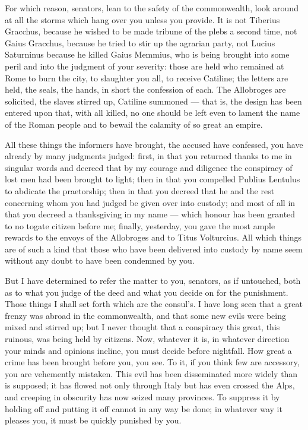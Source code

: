  For which reason, senators, lean to the safety of the commonwealth, look around at all the storms which hang over you unless you provide. It is not Tiberius Gracchus, because he wished to be made tribune of the plebs a second time, not Gaius Gracchus, because he tried to stir up the agrarian party, not Lucius Saturninus because he killed Gaius Memmius, who is being brought into some peril and into the judgment of your severity: those are held who remained at Rome to burn the city, to slaughter you all, to receive Catiline; the letters are held, the seals, the hands, in short the confession of each. The Allobroges are solicited, the slaves stirred up, Catiline summoned --- that is, the design has been entered upon that, with all killed, no one should be left even to lament the name of the Roman people and to bewail the calamity of so great an empire.

 All these things the informers have brought, the accused have confessed, you have already by many judgments judged: first, in that you returned thanks to me in singular words and decreed that by my courage and diligence the conspiracy of lost men had been brought to light; then in that you compelled Publius Lentulus to abdicate the praetorship; then in that you decreed that he and the rest concerning whom you had judged be given over into custody; and most of all in that you decreed a thanksgiving in my name --- which honour has been granted to no togate citizen before me; finally, yesterday, you gave the most ample rewards to the envoys of the Allobroges and to Titus Volturcius. All which things are of such a kind that those who have been delivered into custody by name seem without any doubt to have been condemned by you.

 But I have determined to refer the matter to you, senators, as if untouched, both as to what you judge of the deed and what you decide on for the punishment. Those things I shall set forth which are the consul's. I have long seen that a great frenzy was abroad in the commonwealth, and that some new evils were being mixed and stirred up; but I never thought that a conspiracy this great, this ruinous, was being held by citizens. Now, whatever it is, in whatever direction your minds and opinions incline, you must decide before nightfall. How great a crime has been brought before you, you see. To it, if you think few are accessory, you are vehemently mistaken. This evil has been disseminated more widely than is supposed; it has flowed not only through Italy but has even crossed the Alps, and creeping in obscurity has now seized many provinces. To suppress it by holding off and putting it off cannot in any way be done; in whatever way it pleases you, it must be quickly punished by you.

